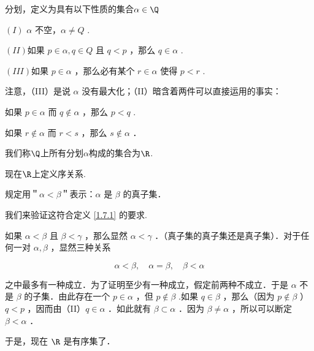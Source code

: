 \begin{definition}\label{1.8.5}
	分划，定义为具有以下性质的集合$\alpha\in\Q$
	
	$(I)$ $\alpha$ 不空，$\alpha \neq Q$ .
	
	$(II)$如果 $p \in \alpha, q \in Q$ 且 $q<p$ ，那么 $q \in \alpha$ .
	
	$(III)$如果 $p \in \alpha$ ，那么必有某个 $r \in \alpha$ 使得 $p<r$ .
\end{definition}
注意，（III）是说 $\alpha$ 没有最大化；（II）暗含着两件可以直接运用的事实：

如果 $p \in \alpha$ 而 $q \notin \alpha$ ，那么 $p<q$ .

如果 $r \notin \alpha$ 而 $r<s$ ，那么 $s \notin \alpha$ ．
\begin{construction}
	我们称$\Q$上所有分划$\alpha$构成的集合为$\R$.
\end{construction}


现在$\R$上定义序关系.
\begin{definition}
	规定用＂$\alpha<\beta$＂表示：$\alpha$ 是 $\beta$ 的真子集．
	
	我们来验证这符合定义 \ref{1.7.1} 的要求.
	
	如果 $\alpha<\beta$ 且 $\beta<\gamma$ ，那么显然 $\alpha<\gamma$ ．（真子集的真子集还是真子集）．对于任何一对 $\alpha, \beta$ ，显然三种关系
	
	$$
	\alpha<\beta, \quad \alpha=\beta, \quad \beta<\alpha
	$$
	
	
	之中最多有一种成立．为了证明至少有一种成立，假定前两种不成立．于是 $\alpha$ 不是 $\beta$ 的子集．由此存在一个 $p \in \alpha$ ，但 $p \notin \beta$ .如果 $q \in \beta$ ，那么（因为 $p \notin \beta$ ）$q<p$ ，因而由（II）$q \in \alpha$ ．如此就有 $\beta \subset \alpha$ ．因为 $\beta \neq \alpha$ ，所以可以断定 $\beta<\alpha$ ．
	
	于是，现在 $\R$ 是有序集了．
\end{definition}

